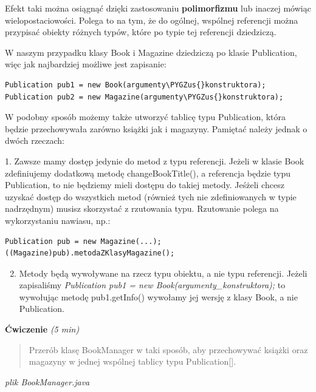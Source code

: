 \documentclass[letterpaper,10pt,english]{sphinxmanual}
\def\PYGZus{\char`\_}
\begin{document}
Efekt taki można osiągnąć dzięki zastosowaniu \textbf{polimorfizmu} lub inaczej mówiąc wielopostaciowości. Polega to na tym, że do ogólnej, wspólnej referencji można przypisać obiekty różnych typów, które po typie tej referencji dziedziczą.

W naszym przypadku klasy Book i Magazine dziedziczą po klasie Publication, więc jak najbardziej możliwe jest zapisanie:

\begin{Verbatim}[commandchars=\\\{\}]
Publication pub1 = new Book(argumenty\PYGZus{}konstruktora);
Publication pub2 = new Magazine(argumenty\PYGZus{}konstruktora);
\end{Verbatim}

W podobny sposób możemy także utworzyć tablicę typu Publication, która będzie przechowywała zarówno książki jak i magazyny. Pamiętać należy jednak o dwóch rzeczach:

1. Zawsze mamy dostęp jedynie do metod z typu referencji. Jeżeli w klasie Book zdefiniujemy dodatkową metodę changeBookTitle(), a referencja będzie typu Publication, to nie będziemy mieli dostępu do takiej metody. Jeśżeli chcesz uzyskać dostęp do wszystkich metod (również tych nie zdefiniowanych w typie nadrzędnym) musisz skorzystać z rzutowania typu. Rzutowanie polega na wykorzystaniu nawiasu, np.:

\begin{Verbatim}[commandchars=\\\{\}]
Publication pub = new Magazine(...);
((Magazine)pub).metodaZKlasyMagazine();
\end{Verbatim}
\begin{enumerate}
\setcounter{enumi}{1}
\item {} 
Metody będą wywoływane na rzecz typu obiektu, a nie typu referencji. Jeżeli zapisaliśmy \emph{Publication pub1 = new Book(argumenty\_konstruktora);} to wywołując metodę pub1.getInfo() wywołamy jej wersję z klasy Book, a nie Publication.

\end{enumerate}

\textbf{Ćwiczenie} \emph{(5 min)}
\begin{quote}

Przerób klasę BookManager w taki sposób, aby przechowywać książki oraz magazyny w jednej wspólnej tablicy typu Publication{[}{]}.
\end{quote}

\emph{plik BookManager.java}
\end{document}
